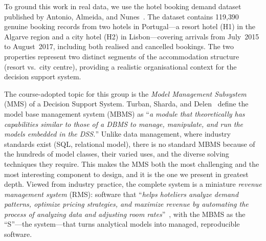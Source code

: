 To ground this work in real data, we use the hotel booking demand dataset published by Antonio, Almeida, and Nunes~\cite{antonio2019}. The dataset contains 119{,}390 genuine booking records from two hotels in Portugal---a resort hotel (H1) in the Algarve region and a city hotel (H2) in Lisbon---covering arrivals from July~2015 to August~2017, including both realised and cancelled bookings. The two properties represent two distinct segments of the accommodation structure (resort vs.\ city centre), providing a realistic organisational context for the decision support system.

The course-adopted topic for this group is the \emph{Model Management Subsystem} (MMS) of a Decision Support System. Turban, Sharda, and Delen~\cite{turban2011} define the model base management system (MBMS) as ``\emph{a module that theoretically has capabilities similar to those of a DBMS to manage, manipulate, and run the models embedded in the DSS.}'' Unlike data management, where industry standards exist (SQL, relational model), there is no standard MBMS because of the hundreds of model classes, their varied uses, and the diverse solving techniques they require. This makes the MMS both the most challenging and the most interesting component to design, and it is the one we present in greatest depth.
Viewed from industry practice, the complete system is a miniature \emph{revenue management system} (RMS): software that ``\emph{helps hoteliers analyze demand patterns, optimize pricing strategies, and maximize revenue by automating the process of analyzing data and adjusting room rates}''~\cite{amadeus2023}, with the MBMS as the ``S''---the system---that turns analytical models into managed, reproducible software.
